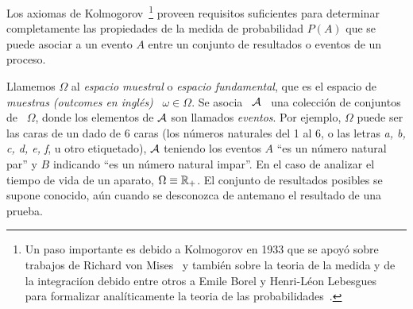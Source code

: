 Los axiomas de Kolmogorov~\footnote{Un paso importante es debido a Kolmogorov en
  1933  que  se apoy\'o  sobre  trabajos  de  Richard von  Mises~\cite{Mis32}  y
  tambi\'en sobre  la teoria de  la medida y  de la integraci\'ion  debido entre
  otros a Emile Borel y Henri-L\'eon Lebesgues~\cite{Bor98, Bor09, Leb04, Leb18,
    Hal50}    para    formalizar    anal\'iticamente    la   teoria    de    las
  probabilidades~\cite{Kol56, BarNov78,   JacPro03}.}    proveen   requisitos
suficientes  para  determinar completamente  las  propiedades  de  la medida  de
probabilidad $P(A)$  que se puede asociar a  un evento $A$ entre  un conjunto de
resultados o eventos de un proceso.

Llamemos $\Omega$ al {\it espacio  muestral} o {\it espacio fundamental}, que es
el espacio de  {\it muestras (outcomes en ingl\'es)} \  $\omega \in \Omega$.  Se
asocia \ $\mathcal{A}$ \ una colecci\'on  de conjuntos de \ $\Omega$, donde los elementos
de $\mathcal{A}$ son llamados {\it eventos}.
Por ejemplo, $\Omega$ puede  ser las caras de un dado de  6 caras (los n\'umeros
naturales del 1 al  6, o las letras {\it a, b, c, d,  e, f}, u otro etiquetado),
$\mathcal{A}$ teniendo los eventos
$A$ ``es  un n\'umero  natural par''  y $B$ indicando  ``es un  n\'umero natural
impar''.
En el caso de analizar el tiempo de vida de un aparato, $\Omega \equiv \mathbb{R}_+$.
El  conjunto  de  resultados  posibles  se  supone  conocido,  a\'un  cuando  se
desconozca de antemano el resultado de una prueba.

